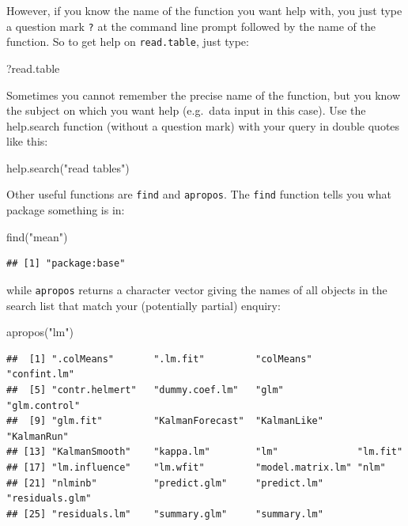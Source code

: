 \documentclass[
]{book}
\newenvironment{Shaded}{\begin{snugshade}}{\end{snugshade}}
\newcommand{\FunctionTok}[1]{\textcolor[rgb]{0.00,0.00,0.00}{#1}}
\newcommand{\NormalTok}[1]{#1}
\newcommand{\StringTok}[1]{\textcolor[rgb]{0.31,0.60,0.02}{#1}}
\theoremstyle{definition}
\theoremstyle{definition}
\theoremstyle{definition}
\theoremstyle{definition}
\theoremstyle{remark}
\begin{document}
However, if you know the name of the function you want help with, you just type a question mark \texttt{?} at the command line prompt followed by the name of the function. So to get help on \texttt{read.table}, just type:

\begin{Shaded}
\begin{Highlighting}[]
\NormalTok{?read.table}
\end{Highlighting}
\end{Shaded}

Sometimes you cannot remember the precise name of the function, but you know the subject on which you want help (e.g.~data input in this case). Use the help.search function (without a question mark) with your query in double quotes like this:

\begin{Shaded}
\begin{Highlighting}[]
\FunctionTok{help.search}\NormalTok{(}\StringTok{"read tables"}\NormalTok{)}
\end{Highlighting}
\end{Shaded}

Other useful functions are \texttt{find} and \texttt{apropos}. The \texttt{find} function tells you what package something is in:

\begin{Shaded}
\begin{Highlighting}[]
\FunctionTok{find}\NormalTok{(}\StringTok{"mean"}\NormalTok{)}
\end{Highlighting}
\end{Shaded}

\begin{verbatim}
## [1] "package:base"
\end{verbatim}

while \texttt{apropos} returns a character vector giving the names of all objects in the search list that match your (potentially partial) enquiry:

\begin{Shaded}
\begin{Highlighting}[]
\FunctionTok{apropos}\NormalTok{(}\StringTok{"lm"}\NormalTok{)}
\end{Highlighting}
\end{Shaded}

\begin{verbatim}
##  [1] ".colMeans"       ".lm.fit"         "colMeans"        "confint.lm"     
##  [5] "contr.helmert"   "dummy.coef.lm"   "glm"             "glm.control"    
##  [9] "glm.fit"         "KalmanForecast"  "KalmanLike"      "KalmanRun"      
## [13] "KalmanSmooth"    "kappa.lm"        "lm"              "lm.fit"         
## [17] "lm.influence"    "lm.wfit"         "model.matrix.lm" "nlm"            
## [21] "nlminb"          "predict.glm"     "predict.lm"      "residuals.glm"  
## [25] "residuals.lm"    "summary.glm"     "summary.lm"
\end{verbatim}
\end{document}
